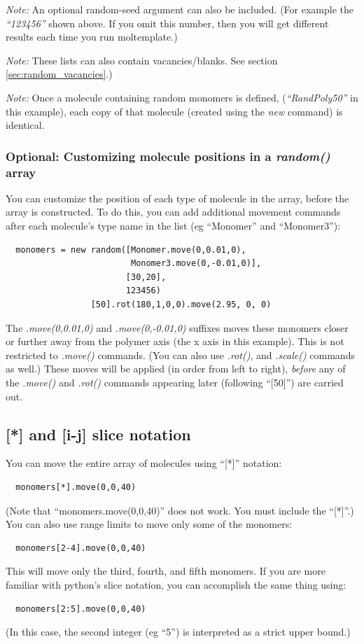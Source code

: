 \documentclass[11pt]{article}
\begin{document}
\textit{Note:}
An optional random-seed argument can also be included.
(For example the \mbox{\textit{``123456''}} shown above.
 If you omit this number, then you will get different 
 results each time you run moltemplate.)

\textit{Note:}
These lists can also contain vacancies/blanks.
See section \ref{sec:random_vacancies}.)

\textit{Note:}
Once a molecule containing random monomers is defined, 
(\mbox{\textit{``RandPoly50''}} in this example), each copy of that molecule 
(created using the \textit{new} command) is identical.

\subsubsection*{Optional: Customizing molecule positions 
                          in a \textit{random()} array}
You can customize the position of each type of molecule in the array,
before the array is constructed.
To do this, you can add additional movement commands after 
each molecule's type name in the list (eg ``Monomer'' and ``Monomer3''):
\begin{verbatim}
  monomers = new random([Monomer.move(0,0.01,0),
                         Monomer3.move(0,-0.01,0)], 
                        [30,20],
                        123456)
                 [50].rot(180,1,0,0).move(2.95, 0, 0) 
\end{verbatim}
The \mbox{\textit{.move(0,0.01,0)}} and \mbox{\textit{.move(0,-0.01,0)}}
suffixes moves these monomers closer or further away from the
polymer axis (the x axis in this example).
This is not restricted to \mbox{\textit{.move()}} commands.
(You can also use \mbox{\textit{.rot()}}, and \mbox{\textit{.scale()}} 
commands as well.)
These moves will be applied (in order from left to right), \textit{before} 
any of the \mbox{\textit{.move()}} and \mbox{\textit{.rot()}}
commands appearing later (following ``[50]'') are carried out.




\subsection{[*] and [i-j] slice notation}
\label{sec:array_wildcards_intro}
You can move the entire array of molecules using ``[*]'' notation:
\begin{verbatim}
  monomers[*].move(0,0,40)
\end{verbatim}
(Note that ``monomers.move(0,0,40)'' does not work.
 You must include the ``[*]''.)
You can also use range limits to move only some of the monomers:
\begin{verbatim}
  monomers[2-4].move(0,0,40)
\end{verbatim}
This will move only the third, fourth, and fifth monomers.
If you are more familiar with python's slice notation, you can 
accomplish the same thing using:
\begin{verbatim}
  monomers[2:5].move(0,0,40)
\end{verbatim}
(In this case, the second integer (eg ``5'') is interpreted as a 
 strict upper bound.)
\end{document}
